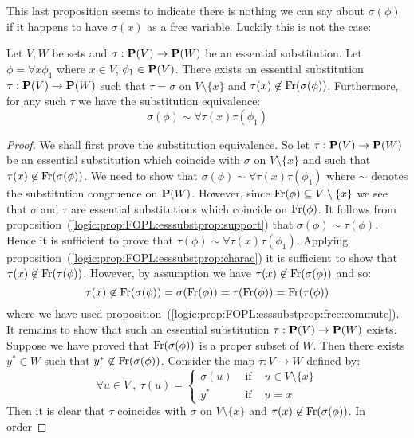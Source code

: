 This last proposition seems to indicate there is nothing we can say
about $\sigma(\phi)$ if it happens to have $\sigma(x)$ as a free
variable. Luckily this is not the case:
\begin{prop}\label{logic:prop:FOPL:esssubstprop:tau}
Let $V,W$ be sets and $\sigma:\mbox{${\bf P}(V)$}\to{\bf P}(W)$ be an essential
substitution. Let $\phi=\forall x\phi_{1}$ where $x\in V$,
$\phi_{1}\in\mbox{${\bf P}(V)$}$. There exists an essential substitution
$\tau:\mbox{${\bf P}(V)$}\to{\bf P}(W)$ such that $\tau=\sigma$ on $V\setminus\{x\}$
and $\tau(x)\not\in\mbox{\rm Fr}(\sigma(\phi))$. Furthermore, for any such
$\tau$ we have the substitution equivalence:
    \[
    \sigma(\phi)\sim\forall\tau(x)\tau(\phi_{1})
    \]
\end{prop}
\begin{proof}
We shall first prove the substitution equivalence. So let
$\tau:\mbox{${\bf P}(V)$}\to{\bf P}(W)$ be an essential substitution which coincide
with $\sigma$ on $V\setminus\{x\}$ and such that
$\tau(x)\not\in\mbox{\rm Fr}(\sigma(\phi))$. We need to show that
$\sigma(\phi)\sim\forall\tau(x)\tau(\phi_{1})$ where $\sim$ denotes
the substitution congruence on ${\bf P}(W)$. However, since
$\mbox{\rm Fr}(\phi)\subseteq V\setminus\{x\}$ we see that $\sigma$ and
$\tau$ are essential substitutions which coincide on $\mbox{\rm Fr}(\phi)$.
It follows from
proposition~(\ref{logic:prop:FOPL:esssubstprop:support}) that
$\sigma(\phi)\sim\tau(\phi)$. Hence it is sufficient to prove that
$\tau(\phi)\sim\forall\tau(x)\tau(\phi_{1})$. Applying
proposition~(\ref{logic:prop:FOPL:esssubstprop:charac}) it is
sufficient to show that $\tau(x)\not\in\mbox{\rm Fr}(\tau(\phi))$. However,
by assumption we have $\tau(x)\not\in\mbox{\rm Fr}(\sigma(\phi))$ and so:
    \[
    \tau(x)\not\in\mbox{\rm Fr}(\sigma(\phi))=\sigma(\mbox{\rm Fr}(\phi))=\tau(\mbox{\rm Fr}(\phi))=\mbox{\rm Fr}(\tau(\phi))
    \]
where we have used
proposition~(\ref{logic:prop:FOPL:esssubstprop:free:commute}). It
remains to show that such an essential substitution $\tau:\mbox{${\bf P}(V)$}\to{\bf
P}(W)$ exists. Suppose we have proved that $\mbox{\rm Fr}(\sigma(\phi))$ is
a proper subset of $W$. Then there exists $y^{*}\in W$ such that
$y^{*}\not\in\mbox{\rm Fr}(\sigma(\phi))$. Consider the map $\tau:V\to W$
defined by:
    \[
    \forall u\in V\ ,\ \tau(u)=\left\{
        \begin{array}{lcl}
        \sigma(u)&\mbox{\ if\ }&u\in V\setminus\{x\}\\
        y^{*}&\mbox{\ if\ }&u=x
        \end{array}
    \right.
    \]
Then it is clear that $\tau$ coincides with $\sigma$ on
$V\setminus\{x\}$ and $\tau(x)\not\in\mbox{\rm Fr}(\sigma(\phi))$. In order

\end{proof}
